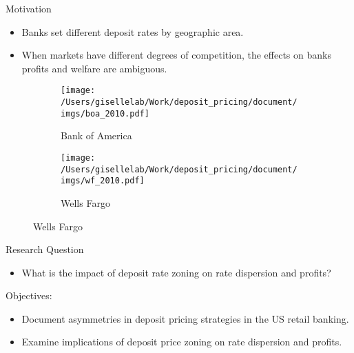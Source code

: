 \documentclass[notes,11pt, aspectratio=169]{beamer}
\begin{document}
   
  \begin{frame}{Motivation}

    \begin{itemize}
        \item Banks set different deposit rates by geographic area. 

        \item When markets have different degrees of competition, the effects on banks profits and welfare are ambiguous.     
    \end{itemize}

    
    \begin{figure}[t*]
      \begin{subfigure}[t]{0.45\textwidth}
        \label{fig:fig1}
      \texttt{[image: /Users/gisellelab/Work/deposit\_pricing/document/imgs/boa\_2010.pdf]}
      \caption{Bank of America}
      \end{subfigure}\hfill
      \begin{subfigure}[t]{0.45\textwidth}
        \label{fig:fig2}
      \texttt{[image: /Users/gisellelab/Work/deposit\_pricing/document/imgs/wf\_2010.pdf]}
      \caption{Wells Fargo}
      \end{subfigure}
    \end{figure}

    \end{frame}
    
  
\begin{frame}{Research Question}

\begin{itemize}
    \item  What is the impact of deposit rate zoning on rate dispersion and profits?
\end{itemize}
\vspace{1cm}
Objectives:
\begin{itemize}
  \item Document asymmetries in deposit pricing strategies in the US retail banking. 
  \item Examine implications of deposit price zoning on rate dispersion and profits.
\end{itemize}

\end{frame}
\end{document}
